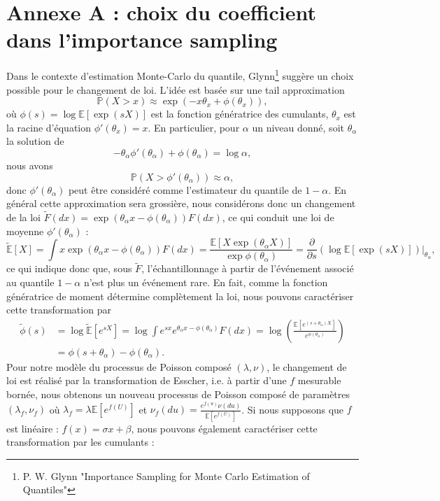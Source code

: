 \documentclass{article}
\def \E {\mathbb{E}}
\def \P {\mathbb{P}}
\begin{document}
\section*{Annexe A : choix du coefficient dans l'importance sampling}
Dans le contexte d'estimation Monte-Carlo du quantile, Glynn\footnote{P. W. Glynn "Importance Sampling for Monte Carlo Estimation of Quantiles"} suggère un choix possible pour le changement de loi. L'idée est basée sur une tail approximation 
\[\P(X>x)\approx \exp(-x\theta_x+\phi(\theta_x)),\]
où $\phi(s)=\log\E[\exp(sX)]$ est la fonction génératrice des cumulants, $\theta_x$ est la racine d'équation $\phi'(\theta_x)=x$. En particulier, pour $\alpha$ un niveau donné, soit $\theta_\alpha$ la solution de
\begin{equation}
\label{eq}
    -\theta_\alpha \phi'(\theta_\alpha)+\phi(\theta_\alpha)=\log \alpha,
\end{equation}
nous avons
\[\P(X>\phi'(\theta_\alpha))\approx \alpha,\]
donc $\phi'(\theta_\alpha)$ peut être considéré comme l'estimateur du quantile de $1-\alpha$. En général cette approximation sera grossière, nous considérons donc un changement de la loi $\tilde{F}(dx)=\exp(\theta_\alpha x-\phi(\theta_\alpha))F(dx)$, ce qui conduit une loi de moyenne $\phi'(\theta_\alpha)$ :
\[\tilde{\E}[X]=\int x\exp(\theta_\alpha x-\phi(\theta_\alpha))F(dx)=\frac{\E[X\exp(\theta_\alpha X)]}{\exp \phi(\theta_\alpha)}=\frac{\partial }{\partial s}(\log\E[\exp(sX)])\biggr|_{\theta_\alpha},\]
ce qui indique donc que, sous $\tilde{F}$, l'échantillonnage à partir de l'événement associé au quantile $1-\alpha$ n'est plus un événement rare. En fait, comme la fonction génératrice de moment détermine complètement la loi, nous pouvons caractériser cette transformation par 
\begin{equation}
\label{1}
\begin{split}
 \tilde{\phi}(s)&=\log\tilde{\E}[e^{sX}]=\log\int e^{sx}e^{\theta_\alpha x-\phi(\theta_\alpha)}F(dx)=\log\left(\frac{\E[e^{(s+\theta_\alpha)X}]}{e^{\phi({\theta_\alpha})}}\right)\\
 &=\phi(s+\theta_\alpha)-\phi(\theta_\alpha).
\end{split}
\end{equation}
Pour notre modèle du processus de Poisson composé $(\lambda,\nu)$, le changement de loi est réalisé par la transformation de Esscher, i.e. à partir d'une $f$ mesurable bornée, nous obtenons un nouveau processus de Poisson composé de paramètres $(\lambda_f,\nu_f)$ 
où $\lambda_f = \lambda \E[e^{f(U)}]$ et $\displaystyle\nu_f(du)=\frac{e^{f(u)}\nu(du)}{\E[e^{f(U)}]}$. Si nous supposons que $f$ est linéaire : $f(x)=\sigma x+\beta$, nous pouvons également caractériser cette transformation par les cumulants :
\end{document}
